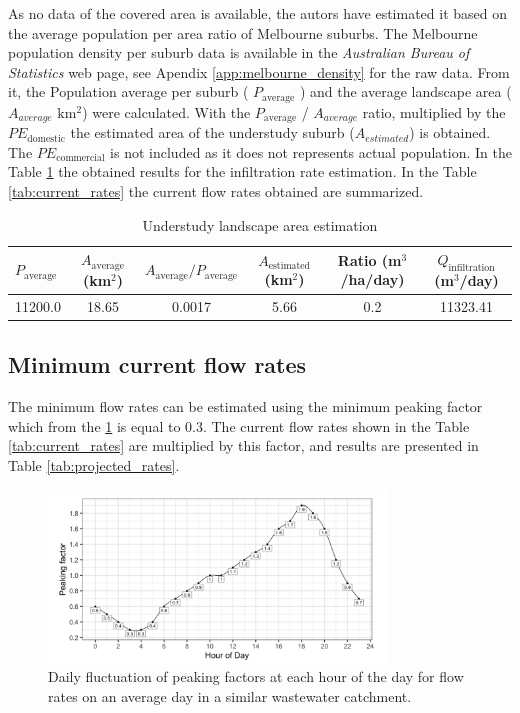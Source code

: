 \documentclass[12pt]{article}
\begin{document}
As no data of the covered area is available, the autors have estimated it based on the average
population per area ratio of Melbourne suburbs. The Melbourne population density per suburb data is available in the 
\textit{Australian Bureau of Statistics} web page, see Apendix  \ref{app:melbourne_density} for the raw data.
From it, the Population average per suburb ( \(P_{\text{average}}\) ) and the average landscape area (\(A_{average}\) \(\mathrm{km^2}\))
were calculated. With the \(P_{\text{average}}\) / \(A_{average}\) ratio, multiplied by the \(PE_{\mathrm{domestic}}\)
the estimated area of the understudy suburb (\(A_{estimated}\)) is obtained. The \(PE_{\mathrm{commercial}}\) is not included
as it does not represents actual population. In the Table \ref{tab:und_study_area} the obtained results for the infiltration 
rate estimation. In the Table \ref{tab:current_rates} the current flow rates obtained are summarized.\\

\begin{table}[h]
  \centering
  \caption{Understudy landscape area estimation}
  \label{tab:und_study_area}
  \begin{tabular}{|p{2cm}|c|c|c|c|c|}
  \hline
  $P_{\text{average}}$ & $A_{\text{average}}$ (km$^2$) & $A_{\text{average}} / P_{\text{average}}$ & $A_{\text{estimated}}$ (km$^2$) & Ratio (m$^3$/ha/day) & $Q_{\text{infiltration}}$ (m$^3$/day) \\
  \hline
  11200.0 & 18.65 & 0.0017 & 5.66 & 0.2 & 11323.41 \\
  \hline
  \end{tabular}
\end{table}


\subsection{Minimum current flow rates}
\label{sec:minimum_current_flowrates}

The minimum flow rates can be estimated using the minimum peaking factor
which from the \ref{fig:peaking_factor} is equal to 0.3. The current flow rates shown in the Table \ref{tab:current_rates}
are multiplied by this factor, and results are presented in Table \ref{tab:projected_rates}.

\begin{figure}[h]
  \centering
  \includegraphics[width=0.8\textwidth]{../images/peaking_factor.png}
  \caption{Daily fluctuation of peaking factors at each hour of the day for flow rates on an average day in a similar wastewater catchment.}
  \label{fig:peaking_factor}
\end{figure}
\end{document}
